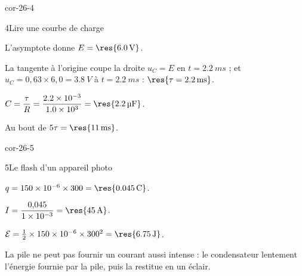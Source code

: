 \begin{blocLivre}{cor-26-4}
\begin{corrige}{4}{Lire une courbe de charge}
\begin{questions}
\item L'asymptote donne $E=\res{\qty{6,0}{V}}$.
\item La tangente à l'origine coupe la droite $u_C=E$ en $t=\qty{2,2}{ms}$ ; et $u_C=0{,}63\times6{,}0=\qty{3,8}{V}$ à $t=\qty{2,2}{ms}$ :
$\res{\tau=\qty{2,2}{ms}}$.
\item $C=\dfrac{\tau}{R}=\dfrac{\num{2.2e-3}}{\num{1.0e3}}=\res{\qty{2,2}{\micro F}}$.
\item Au bout de $5\tau=\res{\qty{11}{ms}}$.
\end{questions}
\end{corrige}
\end{blocLivre}
\begin{blocLivre}{cor-26-5}
\begin{corrige}{5}{Le flash d'un appareil photo}
\begin{questions}
\item $q=\num{150e-6}\times300=\res{\qty{0,045}{C}}$.
\item $I=\dfrac{0{,}045}{\num{1e-3}}=\res{\qty{45}{A}}$.
\item $\mathcal{E}=\frac12\times\num{150e-6}\times300^2=\res{\qty{6,75}{J}}$.
\item La pile ne peut pas fournir un courant aussi intense : le condensateur  lentement l'énergie fournie
par la pile, puis la restitue en un éclair.
\end{questions}
\end{corrige}
\end{blocLivre}

